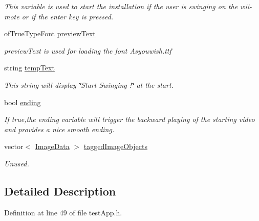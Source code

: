 \begin{DoxyCompactItemize}
\begin{DoxyCompactList}\small\item\em This variable is used to start the installation if the user is swinging on the wii-\/mote or if the enter key is pressed. \end{DoxyCompactList}\item 
of\-True\-Type\-Font \hyperlink{classtest_app_af5b1af55af2256ef3751de075fc7a9cc}{preview\-Text}
\begin{DoxyCompactList}\small\item\em preview\-Text is used for loading the font Asyouwish.\-ttf \end{DoxyCompactList}\item 
string \hyperlink{classtest_app_ad9a4beab6f2e0f13d32b00b502e89bdc}{temp\-Text}
\begin{DoxyCompactList}\small\item\em This string will display \char`\"{}\-Start Swinging !\char`\"{} at the start. \end{DoxyCompactList}\item 
bool \hyperlink{classtest_app_acf09303bc452d2a38098f6bf94655408}{ending}
\begin{DoxyCompactList}\small\item\em If true,the ending variable will trigger the backward playing of the starting video and provides a nice smooth ending. \end{DoxyCompactList}\item 
vector$<$ \hyperlink{struct_image_data}{Image\-Data} $>$ \hyperlink{classtest_app_af65c8dc2f4620bfe7fdf6a39043cb48d}{tagged\-Image\-Objects}
\begin{DoxyCompactList}\small\item\em Unused. \end{DoxyCompactList}\end{DoxyCompactItemize}


\subsection{Detailed Description}


Definition at line 49 of file test\-App.\-h.



